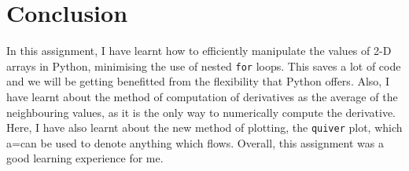 \documentclass[11pt, a4paper]{article}
\begin{document}
\section{Conclusion}
In this assignment, I have learnt how to efficiently manipulate the values of 2-D arrays in Python, minimising the use of nested \texttt{for} loops. This saves a lot of code and we will be getting benefitted from the flexibility that Python offers. Also, I have learnt about the method of computation of derivatives as the average of the neighbouring values, as it is the only way to numerically compute the derivative. Here, I have also learnt about the new method of plotting, the \texttt{quiver} plot, which a=can be used to denote anything which flows. Overall, this assignment was a good learning experience for me.
\end{document}
